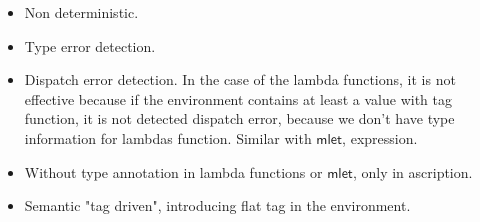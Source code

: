 \documentclass[preprint,authoryear,sort&compress,9pt,nocopyrightspace]{article}
\begin{document}
\begin{itemize}\item Non deterministic.
\item Type error  detection.
\item Dispatch error detection. In the case of the lambda functions, it is not effective because if the environment contains at least a value with tag function, it is not detected  dispatch error, because we don't have type information for lambdas function. Similar with  $\mathsf{mlet}$, expression.
\item Without type annotation in lambda functions or $\mathsf{mlet}$, only in ascription.
\item Semantic "tag driven", introducing flat tag in the environment.

 
\end{itemize}
\end{document}
